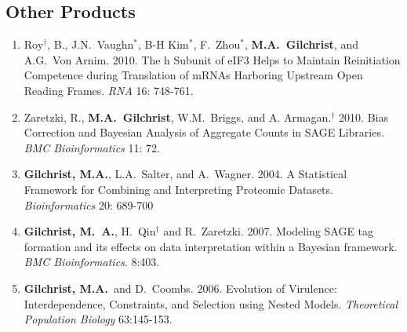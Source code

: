 \documentclass[10pt]{article}
\begin{document}
\subsection*{Other  Products} %
\begin{enumerate}
\item Roy$^\dagger$, B., J.N.~Vaughn$^*$, B-H Kim$^*$, F.~Zhou$^*$, \textbf{M.A.~Gilchrist}, and A.G.~Von Arnim. 2010. The h Subunit of eIF3 Helps to Maintain Reinitiation Competence during Translation of mRNAs Harboring Upstream Open Reading Frames.  \emph{RNA} 16: 748-761.

\item Zaretzki, R., \textbf{M.A.~Gilchrist},  W.M.~Briggs, and A. Armagan$.^\dagger$ 2010. Bias Correction and Bayesian Analysis of Aggregate Counts in SAGE Libraries. \emph{BMC Bioinformatics} 11: 72. 

\item \textbf{Gilchrist, M.A.}, L.A.~Salter, and A.~Wagner.  2004. A Statistical Framework for Combining and Interpreting Proteomic Datasets.   \emph{Bioinformatics} 20: 689-700

\item \textbf{Gilchrist, M.~A.},  H.~Qin$^\dagger$ and R.~Zaretzki. 2007.  Modeling SAGE tag formation and its effects on data interpretation within a Bayesian framework. \emph{{BMC} Bioinformatics}. 8:403.



\item \textbf{Gilchrist, M.A.}~and D.~Coombs. 2006. Evolution of Virulence: Interdependence, Constraints, and Selection using Nested Models.  \emph{Theoretical Population Biology} 63:145-153.




\end{enumerate}
\end{document}
